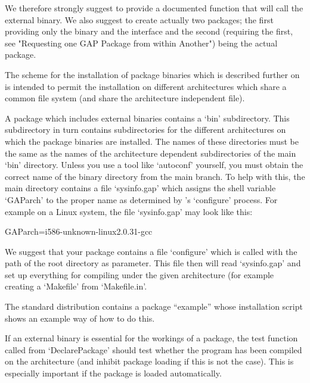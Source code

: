 We therefore strongly suggest to provide a documented {\GAP} function
that will call the external binary. We also suggest to create actually
two {\GAP}  packages; the first providing only the binary and the
interface and the second (requiring the first, see "Requesting one
GAP Package from within Another") being the actual {\GAP} package.


The scheme for the installation of package binaries which is described
further on is intended to permit  the installation on different
architectures which  share a common file  system (and share the
architecture independent file).

A {\GAP} package  which includes external binaries contains a `bin'
subdirectory. This subdirectory in turn contains subdirectories for
the different architectures on which the {\GAP} package binaries are
installed.  The names of these directories must be the same as the
names of the architecture dependent subdirectories of the main `bin'
directory. Unless you use a tool like `autoconf' yourself, you must
obtain the correct name of the binary directory from the main {\GAP}
branch. To help with this, the main {\GAP} directory contains a file
`sysinfo.gap' which assigns the shell variable `GAParch' to the proper
name as determined by {\GAP}'s `configure' process. For example on a
Linux system, the file `sysinfo.gap' may  look like this:

\begintt
GAParch=i586-unknown-linux2.0.31-gcc
\endtt

We suggest that your {\GAP} package contains a file `configure' which
is  called with the  path of  the  {\GAP} root directory  as
parameter. This file then  will  read `sysinfo.gap' and set  up
everything for compiling under the given architecture (for example
creating a `Makefile' from `Makefile.in'.

The standard {\GAP} distribution contains a {\GAP} package ``example''
whose installation script shows an example way of how to do this.


If an external binary is essential for the  workings of a {\GAP} package, the
test function called  from `DeclarePackage' should test whether the program
has been compiled on the architecture (and inhibit package loading if this
is not the case). This is especially important if the package is loaded
automatically.

